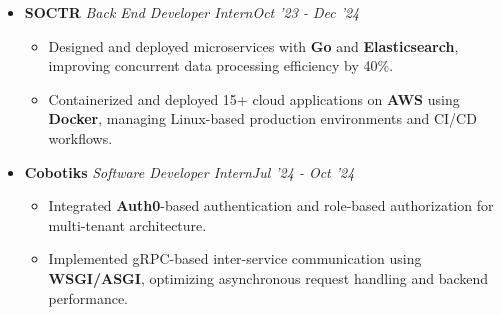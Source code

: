 \documentclass[letterpaper,11pt]{article}
\begin{document}
    \vspace{-14pt}
    \begin{itemize}[leftmargin=0.15in] 
        \item{\textbf{SOCTR}}\hspace{15.9cm}{Remote}
        \textit{Back End Developer Intern}\hspace{11.7cm}\textit{Oct '23 - Dec '24}
        \vspace{-6pt}
        \begin{itemize}[leftmargin=0.2in]            
           \item[$\circ$] {Designed and deployed microservices with \textbf{Go} and \textbf{Elasticsearch}, improving concurrent data processing efficiency by 40\%.}

\vspace{-2pt}

\item[$\circ$] {Containerized and deployed 15+ cloud applications on \textbf{AWS} using \textbf{Docker}, managing Linux-based production environments and CI/CD workflows.}
        \end{itemize}
    \end{itemize}

    \vspace{-15pt}
    \begin{itemize}[leftmargin=0.15in] 
        \item{\textbf{Cobotiks}}\hspace{15.7cm}{Remote}
        \textit{Software Developer Intern}\hspace{11.8cm}\textit{Jul '24 - Oct '24}
        \vspace{-6pt}
        \begin{itemize}[leftmargin=0.2in]            
           \item[$\circ$] {Integrated \textbf{Auth0}-based authentication and role-based authorization for multi-tenant architecture.}

\vspace{-2pt}

\item[$\circ$] {Implemented gRPC-based inter-service communication using \textbf{WSGI/ASGI}, optimizing asynchronous request handling and backend performance.}
        \end{itemize}
    \end{itemize}
\end{document}
